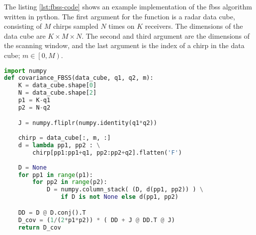 The listing \ref{lst:fbss-code} shows an example implementation of the \gls{fbss} algorithm written in python.
The first argument for the function is a radar data cube, consisting of $M$ chirps sampled $N$ times on $K$ receivers.
The dimensions of the data cube are $K \times M \times N$.
The second and third argument are the dimensions of the scanning window,
and the last argument is the index of a chirp in the data cube; $m \in \left[ 0, M \right)$.

\begin{lstlisting}[language=Python, caption={Code example for applying forward-backward spatial smoothing to a data matrix.},label={lst:fbss-code}]
import numpy
def covariance_FBSS(data_cube, q1, q2, m):
    K = data_cube.shape[0]
    N = data_cube.shape[2]
    p1 = K-q1
    p2 = N-q2

    J = numpy.fliplr(numpy.identity(q1*q2))
    
    chirp = data_cube[:, m, :]
    d = lambda pp1, pp2 : \
        chirp[pp1:pp1+q1, pp2:pp2+q2].flatten('F')
        
    D = None
    for pp1 in range(p1):
        for pp2 in range(p2):
            D = numpy.column_stack( (D, d(pp1, pp2)) ) \
                if D is not None else d(pp1, pp2)

    DD = D @ D.conj().T
    D_cov = (1/(2*p1*p2)) * ( DD + J @ DD.T @ J)
    return D_cov
\end{lstlisting}